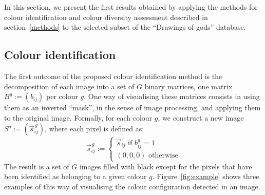 \documentclass[11pt,a4paper]{article}
\begin{document}
In this section, we present the first results obtained by applying the methods for colour identification and colour diversity assessment described in section~\ref{methods} to the selected subset of the ``Drawings of gods'' database.

\subsection{Colour identification}
\label{sec:results_identification}

The first outcome of the proposed colour identification method is the decomposition of each image into a set of $G$ binary matrices, one matrix $B^g := (b_{ij})$ per colour $g$. One way of visualising these matrices consists in using them as an inverted ``mask'', in the sense of image processing, and applying them to the original image. Formally, for each colour $g$, we construct a new image $S^g := (\vec{s}^{\,g}_{ij})$, where each pixel is defined as:
\begin{equation}
	\vec{s}^{\,g}_{ij} := 
	\begin{cases} 
		\vec{s}_{ij} \mbox{ if } b^g_{ij} = 1 \\
		(0, 0, 0) \mbox{ otherwise} 
	\end{cases}
\end{equation}
The result is a set of $G$ images filled with black except for the pixels that have been identified as belonging to a given colour $g$. Figure~\ref{fig:example} shows three examples of this way of visualising the colour configuration detected in an image.
\end{document}
